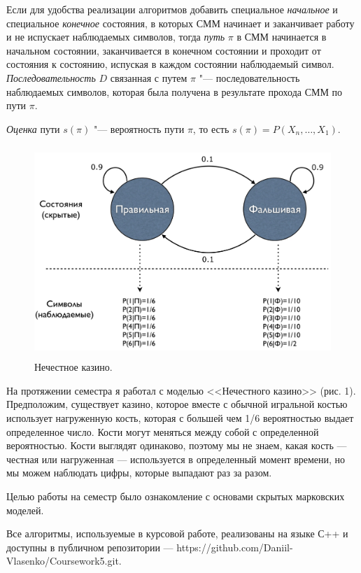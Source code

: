 \documentclass[]{article}
\begin{document}
			Если для удобства реализации алгоритмов добавить специальное \textit{начальное} и специальное \textit{конечное} состояния, в которых СММ начинает и заканчивает работу и не испускает наблюдаемых символов, тогда \textit{путь} $\pi$ в СММ начинается в начальном состоянии, заканчивается в конечном состоянии и проходит от состояния к состоянию, испуская в каждом состоянии наблюдаемый символ. \textit{Последовательность} $D$ связанная с путем $\pi$ "--- последовательность наблюдаемых символов, которая была получена в результате прохода СММ по пути $\pi$.
			
			\textit{Оценка} пути $s(\pi)$ "--- вероятность пути $\pi$, то есть $s(\pi)=P(X_{n},\dots,X_{1})$.
			
			
			
			
			
	
		\begin{figure}[h]
			\includegraphics[width=12cm, height=8cm]{dishonestCasino}
			\centering
			\caption{Нечестное казино.}
		\end{figure}
		
		На протяжении семестра я работал с моделью <<Нечестного казино>> (рис. 1). Предположим, существует казино, которое вместе с обычной игральной костью использует нагруженную кость, которая с большей чем 1/6 вероятностью выдает определенное число. Кости могут меняться между собой с определенной вероятностью. Кости выглядят одинаково, поэтому мы не знаем, какая кость --- честная или нагруженная --- используется в определенный момент времени, но мы можем наблюдать цифры, которые выпадают раз за разом.
		
		Целью работы на семестр было ознакомление с основами скрытых марковских моделей.
		
		Все алгоритмы, используемые в курсовой работе, реализованы на языке С++ и доступны в публичном репозитории --- https://github.com/Daniil-Vlasenko/Coursework5.git.
\end{document}
